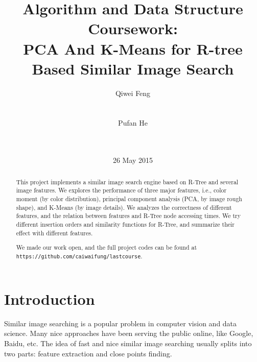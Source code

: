 \documentclass{acm_proc_article-sp}
\begin{document}
\title{Algorithm and Data Structure Coursework: \\PCA And K-Means for
R-tree Based Similar Image Search}
\subtitle{}
%
%
\author{\alignauthor
Qiwei Feng\\
       \\
       \\
\alignauthor
Pufan He\\
       \\
       \\
}
\date{26 May 2015}

\maketitle
\begin{abstract}
This project implements a similar image search engine based on R-Tree and
several image features. We explores the performance of three major features,
i.e., color moment (by color distribution), principal component analysis (PCA,
by image rough shape), and K-Means (by image details). We analyzes the
correctness of different features, and the relation between features and R-Tree
node accessing times. We try different insertion orders and similarity
functions for R-Tree, and summarize their effect with different features.

We made our work open, and the full project codes can be found at \texttt{https://github.com/caiwaifung/lastcourse}.
\end{abstract}


\section{Introduction}
Similar image searching is a popular problem in computer vision and data
science. Many nice approaches have been serving the public online, like Google,
Baidu, etc. The idea of fast and nice similar image searching usually splits
into two parts: feature extraction and close points finding.
\end{document}

